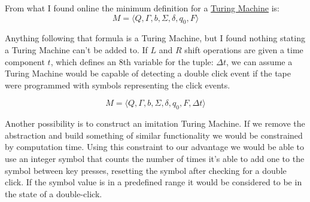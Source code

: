 \documentclass{article}
\begin{document}
From what I found online the minimum definition for a 
\href{https://en.wikipedia.org/wiki/Turing_machine#Formal_definition}
{Turing Machine} is:
$$M = \langle Q, \Gamma, b, \Sigma, \delta, q_0, F \rangle$$

Anything following that formula is a Turing Machine, but I found nothing 
stating a Turing Machine can't be added to. If $L$ and $R$ shift operations are 
given a time component $t$, which defines an 8th variable for the tuple: 
$\Delta t$, we can assume a Turing Machine would be capable of detecting a double 
click event if the tape were programmed with symbols representing the click 
events.

$$M = \langle Q, \Gamma, b, \Sigma, \delta, q_0, F, \Delta t \rangle$$

Another possibility is to construct an imitation Turing Machine. If we remove 
the abstraction and build something of similar functionality we would be 
constrained by computation time. Using this constraint to our advantage we would 
be able to use an integer symbol that counts the number of times it's able to 
add one to the symbol between key presses, resetting the symbol after checking 
for a double click. If the symbol value is in a predefined range it would be 
considered to be in the state of a double-click.
\end{document}
